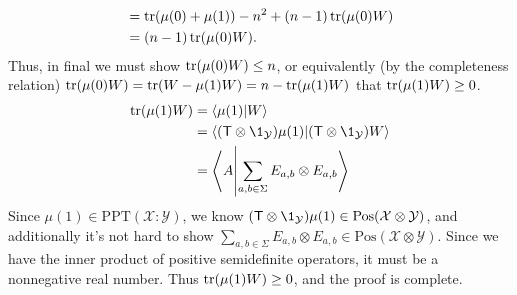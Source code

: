 \documentclass[boxes,pages,color=SeaGreen]{homework}
\newcommand{\X}{\mathcal{X}}
\newcommand{\Y}{\mathcal{Y}}
\newcommand{\Pos}{\mathrm{Pos}}
\newcommand{\PPT}{\mathrm{PPT}}
\begin{document}
\begin{solution}
\begin{align*}
                                      & = \tr(\mu(0) + \mu(1)) - n^2 + (n-1)\tr(\mu(0)W)         \\
                                      & = (n-1)\tr(\mu(0)W).
  \end{align*}
  Thus, in final we must show $\tr(\mu(0)W) \leq n$, or equivalently (by the completeness relation) $\tr(\mu(0)W) = \tr(W - \mu(1)W) = n - \tr(\mu(1)W)$ that $\tr(\mu(1)W) \geq 0$.
  \begin{align*}
    \tr(\mu(1)W) & = \ip{\mu(1)}{W}                                                 \\
                 & = \ip{(\mathsf{T}\otimes\1_\Y)\mu(1)}{(\mathsf{T}\otimes\1_\Y)W} \\
                 & = \ip{A}{\sum_{a,b\in\Sigma}E_{a,b}\otimes E_{a,b}}
  \end{align*}
  Since $\mu(1) \in \PPT(\X:\Y)$, we know $(\mathsf{T}\otimes\1_\Y)\mu(1)\in\Pos(\X\otimes\Y)$, and additionally it's not hard to show $\sum_{a,b\in\Sigma}E_{a,b}\otimes E_{a,b}\in\Pos(\X\otimes\Y)$.
  Since we have the inner product of positive semidefinite operators, it must be a nonnegative real number.
  Thus $\tr(\mu(1)W) \geq 0$, and the proof is complete.
\end{solution}
\end{document}
